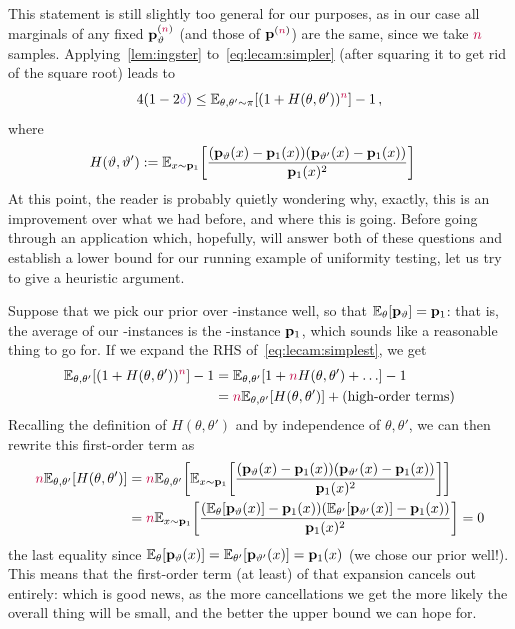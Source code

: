 This statement is still slightly too general for our purposes, as in our case all marginals of any fixed $\mathbf{p}_\vartheta^{({\textcolor{purple}{n}})}$ (and those of $\mathbf{p}^{({\textcolor{purple}{n}})}$) are the same, since we take ${\textcolor{purple}{n}}$ \iid samples. Applying~\cref{lem:ingster} to~\cref{eq:lecam:simpler} (after squaring it to get rid of the square root) leads to
\begin{equation}
	\label{eq:lecam:simplest}
	4(1-2\errprob) \leq \bE{\theta,\theta'\sim\pi}{(1+{H(\theta,\theta')})^\ns} - 1\,,
\end{equation}
where 
\begin{align}
H(\vartheta,\vartheta') &\eqdef \bE{x\sim\p_\accept}{\frac{(\p_{\vartheta}(x)-\p_\accept(x))(\p_{\vartheta'}(x)-\p_\accept(x))}{\p_\accept(x)^2}}
\end{align}
At this point, the reader is probably quietly wondering why, exactly, this is an improvement over what we had before, and where this is going. Before going through an application which, hopefully, will answer both of these questions and establish a lower bound for our running example of uniformity testing, let us try to give a heuristic argument.

Suppose that we pick our prior over \no-instance well, so that $\bE{\theta}{\p_{\vartheta}}=\p_1$: that is, the average of our \no-instances is the \yes-instance $\mathbf{p}_1$, which sounds like a reasonable thing to go for. If we expand the RHS of~\cref{eq:lecam:simplest}, we get
\begin{align*}
\bE{\theta,\theta'}{(1+{H(\theta,\theta')})^\ns} - 1 
&=\bE{\theta,\theta'}{1+\ns H(\theta,\theta') + \dots } - 1 \\
&= \ns \bE{\theta,\theta'}{H(\theta,\theta')} + \textrm{(high-order terms)}
\end{align*}
Recalling the definition of $H(\theta,\theta')$ and by independence of $\theta,\theta'$, we can then rewrite this first-order term as
\begin{align*}
\ns \bE{\theta,\theta'}{H(\theta,\theta')}
&= \ns \bE{\theta,\theta'}{\bE{x\sim\p_\accept}{\frac{(\p_{\vartheta}(x)-\p_\accept(x))(\p_{\vartheta'}(x)-\p_\accept(x))}{\p_\accept(x)^2}}}\\
&=\ns \bE{x\sim\p_\accept}{\frac{(\bE{\theta}{\p_{\vartheta}(x)}-\p_\accept(x))(\bE{\theta'}{\p_{\vartheta'}(x)}-\p_\accept(x))}{\p_\accept(x)^2}}
= 0
\end{align*}
the last equality since $\bE{\theta}{\p_{\vartheta}(x)}=\bE{\theta'}{\p_{\vartheta'}(x)}=\p_\accept(x)$ (we chose our prior well!). This means that the first-order term (at least) of that expansion cancels out entirely: which is good news, as the more cancellations we get the more likely the overall thing will be small, and the better the upper bound we can hope for.
\tbc


